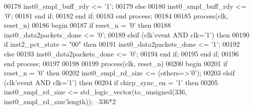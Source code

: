 \begin{DoxyCode}
00178          inst0\_smpl\_buff\_rdy <= '1';
00179       \textcolor{keywordflow}{else} 
00180          inst0\_smpl\_buff\_rdy <= '0';
00181       \textcolor{keywordflow}{end} \textcolor{keywordflow}{if};
00182    \textcolor{keywordflow}{end} \textcolor{keywordflow}{if};
00183 \textcolor{keywordflow}{end} \textcolor{keywordflow}{process};
00184 
00185 \textcolor{keywordflow}{process}(clk, reset_n)
00186 \textcolor{vhdlkeyword}{begin}
00187    \textcolor{keywordflow}{if} \textcolor{vhdlchar}{reset_n} \textcolor{vhdlchar}{=} \textcolor{vhdlchar}{'}\textcolor{vhdllogic}{}\textcolor{vhdllogic}{0}\textcolor{vhdlchar}{'} \textcolor{keywordflow}{then} 
00188       inst0\_data2packets\_done <= '0';
00189    \textcolor{keywordflow}{elsif} \textcolor{vhdlchar}{(}\textcolor{vhdlchar}{clk}\textcolor{vhdlchar}{'}\textcolor{vhdlkeyword}{event} \textcolor{keywordflow}{AND} \textcolor{vhdlchar}{clk}\textcolor{vhdlchar}{=}\textcolor{vhdlchar}{'}\textcolor{vhdllogic}{}\textcolor{vhdllogic}{1}\textcolor{vhdlchar}{'}\textcolor{vhdlchar}{)} \textcolor{keywordflow}{then}
00190       \textcolor{keywordflow}{if} \textcolor{vhdlchar}{inst2_pct_state} \textcolor{vhdlchar}{=} \textcolor{vhdllogic}{"00"} \textcolor{keywordflow}{then} 
00191          inst0\_data2packets\_done <= '1';
00192       \textcolor{keywordflow}{else} 
00193          inst0\_data2packets\_done <= '0';
00194       \textcolor{keywordflow}{end} \textcolor{keywordflow}{if};
00195    \textcolor{keywordflow}{end} \textcolor{keywordflow}{if};
00196 \textcolor{keywordflow}{end} \textcolor{keywordflow}{process};
00197 
00198 
00199 \textcolor{keywordflow}{process}(clk, reset_n)
00200 \textcolor{vhdlkeyword}{begin}
00201    \textcolor{keywordflow}{if} \textcolor{vhdlchar}{reset_n} \textcolor{vhdlchar}{=} \textcolor{vhdlchar}{'}\textcolor{vhdllogic}{}\textcolor{vhdllogic}{0}\textcolor{vhdlchar}{'} \textcolor{keywordflow}{then} 
00202       inst0\_smpl\_rd\_size <= (others=>'0');
00203    \textcolor{keywordflow}{elsif} \textcolor{vhdlchar}{(}\textcolor{vhdlchar}{clk}\textcolor{vhdlchar}{'}\textcolor{vhdlkeyword}{event} \textcolor{keywordflow}{AND} \textcolor{vhdlchar}{clk}\textcolor{vhdlchar}{=}\textcolor{vhdlchar}{'}\textcolor{vhdllogic}{}\textcolor{vhdllogic}{1}\textcolor{vhdlchar}{'}\textcolor{vhdlchar}{)} \textcolor{keywordflow}{then} 
00204         \textcolor{keywordflow}{if} \textcolor{vhdlchar}{chirp_sync_en} \textcolor{vhdlchar}{=} \textcolor{vhdlchar}{'}\textcolor{vhdllogic}{}\textcolor{vhdllogic}{1}\textcolor{vhdlchar}{'} \textcolor{keywordflow}{then}
00205             inst0\_smpl\_rd\_size <= \textcolor{comment}{std\_logic\_vector}(to\_unsigned(\textcolor{vhdllogic}{336}, inst0\_smpl\_rd\_size'length)); --336*2 \textcolor{keywordflow}{
}
\end{DoxyCode}
